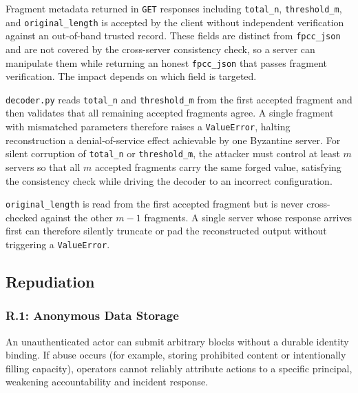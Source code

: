 \documentclass[../veristore_security_model.tex]{subfiles}
\begin{document}

Fragment metadata returned in \texttt{GET} responses \textendash{} including \texttt{total\_n}, \texttt{threshold\_m}, and \texttt{original\_length} \textendash{} is accepted by the client without independent verification against an out-of-band trusted record. These fields are distinct from \texttt{fpcc\_json} and are not covered by the cross-server consistency check, so a server can manipulate them while returning an honest \texttt{fpcc\_json} that passes fragment verification. The impact depends on which field is targeted.

\texttt{decoder.py} reads \texttt{total\_n} and \texttt{threshold\_m} from the first accepted fragment and then validates that all remaining accepted fragments agree. A single fragment with mismatched parameters therefore raises a \texttt{ValueError}, halting reconstruction \textendash{} a denial-of-service effect achievable by one Byzantine server. For silent corruption of \texttt{total\_n} or \texttt{threshold\_m}, the attacker must control at least $m$ servers so that all $m$ accepted fragments carry the same forged value, satisfying the consistency check while driving the decoder to an incorrect configuration.

\texttt{original\_length} is read from the first accepted fragment but is never cross-checked against the other $m - 1$ fragments. A single server whose response arrives first can therefore silently truncate or pad the reconstructed output without triggering a \texttt{ValueError}.

\subsection{Repudiation}


\subsubsection{R.1: Anonymous Data Storage}

An unauthenticated actor can submit arbitrary blocks without a durable identity binding.
If abuse occurs (for example, storing prohibited content or intentionally filling capacity),
operators cannot reliably attribute actions to a specific principal, weakening accountability
and incident response.
\end{document}
